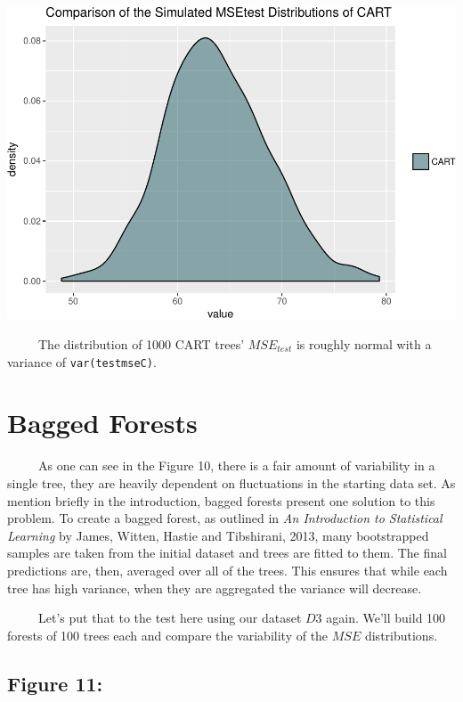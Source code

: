 \documentclass[12pt,twoside]{reedthesis}
\begin{document}
  \begin{center}\includegraphics{Thesis_files/figure-latex/fig10-1} \end{center}
  
  ~~~~~The distribution of 1000 CART trees' \(MSE_{test}\) is roughly
  normal with a variance of \texttt{var(testmseC)}.
  
  \section{Bagged Forests}\label{bagged-forests}
  
  ~~~~~As one can see in the Figure 10, there is a fair amount of
  variability in a single tree, they are heavily dependent on fluctuations
  in the starting data set. As mention briefly in the introduction, bagged
  forests present one solution to this problem. To create a bagged forest,
  as outlined in \emph{An Introduction to Statistical Learning} by James,
  Witten, Hastie and Tibshirani, 2013, many bootstrapped samples are taken
  from the initial dataset and trees are fitted to them. The final
  predictions are, then, averaged over all of the trees. This ensures that
  while each tree has high variance, when they are aggregated the variance
  will decrease.
  
  ~~~~~Let's put that to the test here using our dataset \(D3\) again.
  We'll build 100 forests of 100 trees each and compare the variability of
  the \(MSE\) distributions.
  
  \subsection{Figure 11:}\label{figure-11}
  
\end{document}

